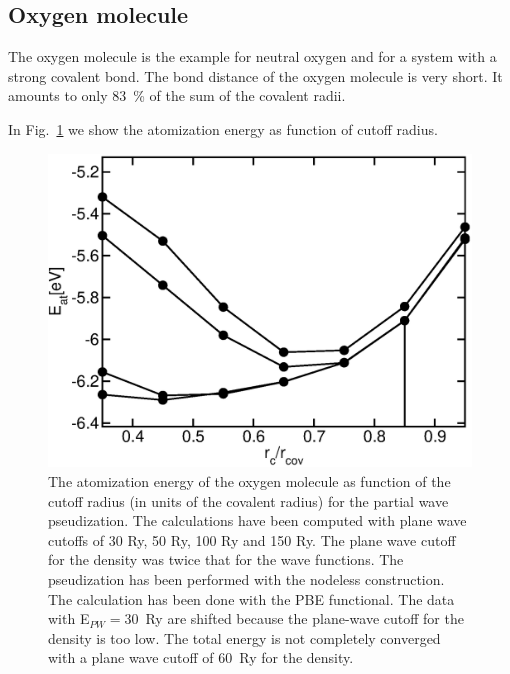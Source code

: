 \documentclass[11pt,a4paper]{report}
\begin{document}
\subsection{Oxygen molecule}
The oxygen molecule is the example for neutral oxygen and for a system
with a strong covalent bond. The bond distance of the oxygen molecule
is very short. It amounts to only 83~\% of the sum of the covalent
radii.

In Fig.~\ref{o2_eatinev_ndlssofrad} we
show the atomization energy as function of cutoff radius. 

\begin{figure}[!h]
\begin{center}
\includegraphics[width=0.5\linewidth,clip=true]
{Figs/O2_atomizationenergy/eofrc.eps}
\end{center}
\caption{\label{o2_eatinev_ndlssofrad}The atomization energy of the
  oxygen molecule as function of the cutoff radius (in units of the
  covalent radius) for the partial wave pseudization. The calculations
  have been computed with plane wave cutoffs of 30 Ry, 50 Ry, 100 Ry
  and 150 Ry. The plane wave cutoff for the density was twice that for
  the wave functions. The pseudization has been performed with the
  nodeless construction. The calculation has been done with the PBE
  functional. The data with E$_{PW}=30$~Ry are shifted because the
  plane-wave cutoff for the density is too low.  The total energy is
  not completely converged with a plane wave cutoff of 60~Ry for the
  density.  }
\end{figure}
\end{document}
